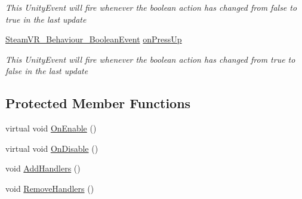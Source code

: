 \begin{DoxyCompactItemize}
\begin{DoxyCompactList}\small\item\em This Unity\+Event will fire whenever the boolean action has changed from false to true in the last update \end{DoxyCompactList}\item 
\mbox{\hyperlink{class_valve_1_1_v_r_1_1_steam_v_r___behaviour___boolean_event}{Steam\+V\+R\+\_\+\+Behaviour\+\_\+\+Boolean\+Event}} \mbox{\hyperlink{class_valve_1_1_v_r_1_1_steam_v_r___behaviour___boolean_ab81b2dae4a38e689a81af644da2c8ff4}{on\+Press\+Up}}
\begin{DoxyCompactList}\small\item\em This Unity\+Event will fire whenever the boolean action has changed from true to false in the last update \end{DoxyCompactList}\end{DoxyCompactItemize}
\subsection*{Protected Member Functions}
\begin{DoxyCompactItemize}
\item 
virtual void \mbox{\hyperlink{class_valve_1_1_v_r_1_1_steam_v_r___behaviour___boolean_ae0bebdd1322463f3cd70b9cdc91ece76}{On\+Enable}} ()
\item 
virtual void \mbox{\hyperlink{class_valve_1_1_v_r_1_1_steam_v_r___behaviour___boolean_a3c4c6231615ac96e43cd5646dc515cfd}{On\+Disable}} ()
\item 
void \mbox{\hyperlink{class_valve_1_1_v_r_1_1_steam_v_r___behaviour___boolean_ace248524b7a7f0cf0e7481daa34fa01b}{Add\+Handlers}} ()
\item 
void \mbox{\hyperlink{class_valve_1_1_v_r_1_1_steam_v_r___behaviour___boolean_a5045745f25bd2a4ad2238782b551da5e}{Remove\+Handlers}} ()
\end{DoxyCompactItemize}
